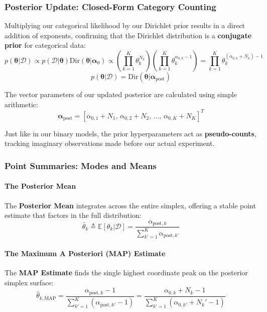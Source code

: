 \documentclass{article}
\begin{document}
\subsubsection{Posterior Update: Closed-Form Category Counting}
Multiplying our categorical likelihood by our Dirichlet prior results in a direct addition of exponents, confirming that the Dirichlet distribution is a \textbf{conjugate prior} for categorical data:
\begin{equation}
p(\boldsymbol{\theta}|\mathcal{D}) \propto p(\mathcal{D}|\boldsymbol{\theta})\text{Dir}(\boldsymbol{\theta}|\boldsymbol{\alpha}_0) \propto \left( \prod_{k=1}^K \theta_k^{N_k} \right) \left( \prod_{k=1}^K \theta_k^{\alpha_{0,k} - 1} \right) = \prod_{k=1}^K \theta_k^{(\alpha_{0,k} + N_k) - 1}
\end{equation}
\begin{equation}
p(\boldsymbol{\theta}|\mathcal{D}) = \text{Dir}(\boldsymbol{\theta}|\boldsymbol{\alpha}_{\text{post}})
\end{equation}

The vector parameters of our updated posterior are calculated using simple arithmetic:
\begin{equation}
\boldsymbol{\alpha}_{\text{post}} = [\alpha_{0,1} + N_1, \, \alpha_{0,2} + N_2, \, \dots, \, \alpha_{0,K} + N_K]^T
\end{equation}

Just like in our binary models, the prior hyperparameters act as \textbf{pseudo-counts}, tracking imaginary observations made before our actual experiment.

\subsubsection{Point Summaries: Modes and Means}

\paragraph{The Posterior Mean}
The \textbf{Posterior Mean} integrates across the entire simplex, offering a stable point estimate that factors in the full distribution:
\begin{equation}
\bar{\theta}_k \triangleq \mathbb{E}[\theta_k|\mathcal{D}] = \frac{\alpha_{\text{post},k}}{\sum_{k'=1}^K \alpha_{\text{post},k'}}
\end{equation}

\paragraph{The Maximum A Posteriori (MAP) Estimate}
The \textbf{MAP Estimate} finds the single highest coordinate peak on the posterior simplex surface:
\begin{equation}
\hat{\theta}_{k,\text{MAP}} = \frac{\alpha_{\text{post},k} - 1}{\sum_{k'=1}^K (\alpha_{\text{post},k'} - 1)} = \frac{\alpha_{0,k} + N_k - 1}{\sum_{k'=1}^K (\alpha_{0,k'} + N_k' - 1)}
\end{equation}
\end{document}
